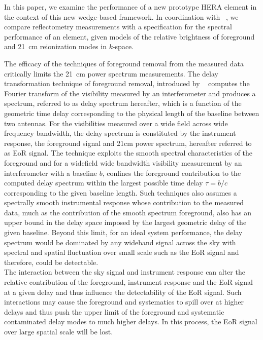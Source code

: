 \documentclass[twocolumn]{emulateapj}
\begin{document}
In this paper, we examine the performance of a new prototype HERA element in the context of
this new wedge-based framework.  In coordination with ~\citet{XXXsisterpapers}, we compare 
reflectometry measurements with
a specification for the spectral performance of an element, given models of the relative brightness of
foreground and 21~cm reionization modes in $k$-space.  



The efficacy of the techniques of foreground removal from the measured data critically limits the 21~cm power spectrum measurements. The delay transformation technique of foreground removal, introduced by  ~\citep{ParsonsBacker2009,Parsons2012} computes the Fourier transform of the visibility measured by an interferometer and produces a spectrum, referred to as delay spectrum hereafter, which is a function of the geometric time delay corresponding to the physical length of the baseline between two antennas. For the visibilities measured over a wide field across wide frequency bandwidth, the delay spectrum is constituted by the instrument response, the foreground signal and 21cm power spectrum, hereafter referred to as EoR signal.
The technique exploits the smooth spectral characteristics of the foreground and for a widefield wide bandwidth visibility measurement by an interferometer with a baseline $b$, confines the foreground contribution to the computed delay spectrum within the largest possible time delay $\tau = b/c$ corresponding to the given baseline length. Such techniques also assumes a spectrally smooth instrumental response whose contribution to the measured data, much as the contribution of the smooth spectrum foreground, also has an upper bound in the delay space imposed by the largest geometric delay of the given baseline. 
Beyond this limit, for an ideal system performance, the delay spectrum would be dominated by any wideband signal across the sky with spectral and spatial fluctuation over small scale such as the EoR signal and therefore, could be detectable.\\ 
The interaction between the sky signal and instrument response can alter the relative contribution of the foreground, instrument response and the EoR signal at a given delay and thus influence the detectability of the EoR signal. Such interactions may cause the foreground and systematics to spill over at higher delays and thus push the upper limit of the foreground and systematic contaminated delay modes to much higher delays. In this process, the EoR signal over large spatial scale will be lost.
\end{document}
